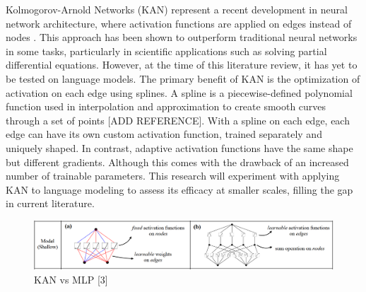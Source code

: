 Kolmogorov-Arnold Networks (KAN) represent a recent development in neural network architecture, where activation functions are applied on edges instead of nodes \cite{Liu2024}. This approach has been shown to outperform traditional neural networks in some tasks, particularly in scientific applications such as solving partial differential equations. However, at the time of this literature review, it has yet to be tested on language models. The primary benefit of KAN is the optimization of activation on each edge using splines. A spline is a piecewise-defined polynomial function used in interpolation and approximation to create smooth curves through a set of points [ADD REFERENCE]. With a spline on each edge, each edge can have its own custom activation function, trained separately and uniquely shaped. In contrast, adaptive activation functions have the same shape but different gradients. Although this comes with the drawback of an increased number of trainable parameters. This research will experiment with applying KAN to language modeling to assess its efficacy at smaller scales, filling the gap in current literature.

\vspace*{\fill}
\begin{figure}[ht]
    \centering
    \includegraphics[width=\columnwidth * 2]{figures/kan-network.png}
    \caption{KAN vs MLP [3]}
    \label{fig:your-label}
\end{figure}
\vspace*{\fill}